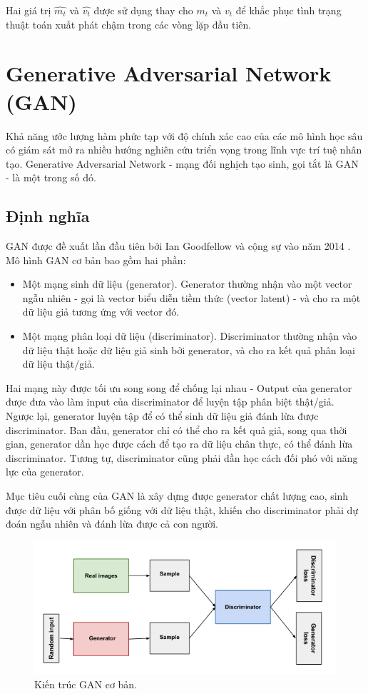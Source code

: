 \documentclass[12pt]{extreport}
\begin{document}
Hai giá trị $ \hat{m_t} $ và $ \hat{v_t} $ được sử dụng thay cho  $ m_t $ và  $ v_t $ để khắc phục tình trạng thuật toán xuất phát chậm trong các vòng lặp đầu tiên.

\section{Generative Adversarial Network (GAN)}

Khả năng ước lượng hàm phức tạp với độ chính xác cao của các mô hình học sâu có giám sát mở ra nhiều hướng nghiên cứu triển vọng trong lĩnh vực trí tuệ nhân tạo. Generative Adversarial Network - mạng đối nghịch tạo sinh, gọi tắt là GAN - là một trong số đó.

\subsection{Định nghĩa}

GAN được đề xuất lần đầu tiên bởi Ian Goodfellow và cộng sự vào năm 2014 \cite{NIPS2014_5ca3e9b1}. Mô hình GAN cơ bản bao gồm hai phần:

\begin{itemize}
    \item Một mạng sinh dữ liệu (generator). Generator thường nhận vào một vector ngẫu nhiên - gọi là vector biểu diễn tiềm thức (vector latent) - và cho ra một dữ liệu giả tương ứng với vector đó.
    \item Một mạng phân loại dữ liệu (discriminator). Discriminator thường nhận vào dữ liệu thật hoặc dữ liệu giả sinh bởi generator, và cho ra kết quả phân loại dữ liệu thật/giả.
\end{itemize}

Hai mạng này được tối ưu song song để chống lại nhau - Output của generator được đưa vào làm input của discriminator để luyện tập phân biệt thật/giả. Ngược lại, generator luyện tập để có thể sinh dữ liệu giả đánh lừa được discriminator. Ban đầu, generator chỉ có thể cho ra kết quả giả, song qua thời gian, generator dần học được cách để tạo ra dữ liệu chân thực, có thể đánh lừa discriminator. Tương tự, discriminator cũng phải dần học cách đối phó với năng lực của generator.

Mục tiêu cuối cùng của GAN là xây dựng được generator chất lượng cao, sinh được dữ liệu với phân bố giống với dữ liệu thật, khiến cho discriminator phải dự đoán ngẫu nhiên và đánh lừa được cả con người.

\begin{figure}[H]
    \centering
    \includegraphics[width=\textwidth]{figure13.png}
    \caption{Kiến trúc GAN cơ bản.}
\end{figure}
\end{document}
